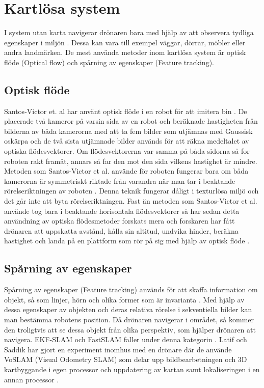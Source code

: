 \section{Kartlösa system}

I system utan karta navigerar drönaren bara med hjälp av att observera tydliga egenskaper i miljön \citep{982903}. Dessa kan vara till exempel väggar, dörrar, möbler eller andra landmärken. De mest använda metoder inom kartlösa system är optisk flöde (Optical flow) och spårning av egenskaper (Feature tracking). 

\subsection{Optisk flöde}

Santos-Victor et. al har använt optisk flöde i en robot för att imitera bin \citep{341094}. De placerade två kameror på varsin sida av en robot och beräknade hastigheten från bilderna av båda kamerorna med att ta fem bilder som utjämnas med Gaussisk oskärpa och de två sista utjämnade bilder används för att räkna medeltalet av optiska flödesvektorer. Om flödesvektorerna var samma på båda sidorna så for roboten rakt framåt, annars så far den mot den sida vilkens hastighet är mindre. Metoden som Santos-Victor et al. använde för roboten fungerar bara om båda kamerorna är symmetriskt riktade från varandra när man tar i beaktande rörelseriktningen av roboten \citep{982903}. Denna teknik fungerar dåligt i texturlösa miljö och det går inte att byta rörelseriktningen. Fast än metoden som Santos-Victor et al. använde tog bara i beaktande horisontala flödesvektorer så har sedan detta användning av optiska flödesmetoder forskats mera och forskaren har fått drönaren att uppskatta avstånd, hålla sin altitud, undvika hinder, beräkna hastighet och landa på en plattform som rör på sig med hjälp av optisk flöde \citep{6564752}.

\subsection{Spårning av egenskaper}

Spårning av egenskaper (Feature tracking) används för att skaffa information om objekt, så som linjer, hörn och olika former som är invarianta \citep{geospatial}. Med hjälp av dessa egenskaper av objekten och deras relativa rörelse i sekventiella bilder kan man bestämma robotens position. Då drönaren navigerar i området, så kommer den troligtvis att se dessa objekt från olika perspektiv, som hjälper drönaren att navigera. EKF-SLAM och FastSLAM faller under denna kategorin \cite{8930783}. Latif och Saddik har gjort en experiment inomhus med en drönare där de använde VoSLAM (Visual Odometry SLAM) som delar upp bildbearbetningen och 3D kartbyggande i egen processor och uppdatering av kartan samt lokaliseringen i en annan processor \citep{8930783}.


